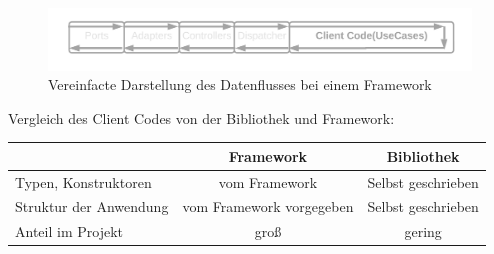 \begin{figure}[H]
    \centering
    \includegraphics[width=1\textwidth]{./images/Dataflow Framework.png}
    \caption{Vereinfacte Darstellung des Datenflusses bei einem Framework}
    \label{fig:SimpliedDataflowFramework}
\end{figure}

Vergleich des Client Codes von der Bibliothek und Framework: 

\begin{tabular}{ |l|c|c| } 
    \hline
                                                            & Framework & Bibliothek \\ 
                                                            \hline
    Typen, Konstruktoren                                    & vom Framework             & Selbst geschrieben \\ 
    Struktur der Anwendung                                  & vom Framework vorgegeben  & Selbst geschrieben \\
    Anteil im Projekt                                       & groß       & gering \\ 
    \hline
\end{tabular}